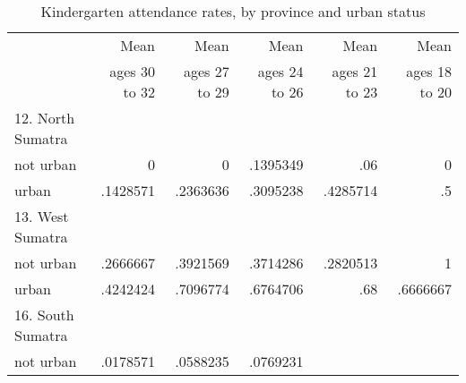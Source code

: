 \begin{table}[!h]
\caption{Kindergarten attendance rates, by province and urban status}
\centering
\begin{tabular}{llllll}
\cline{1-6}
\multicolumn{1}{c}{} &
  \multicolumn{1}{|r}{Mean} &
  \multicolumn{1}{r}{Mean} &
  \multicolumn{1}{r}{Mean} &
  \multicolumn{1}{r}{Mean} &
  \multicolumn{1}{r}{Mean} \\
\multicolumn{1}{c}{} &
  \multicolumn{1}{|r}{ages 30 to 32} &
  \multicolumn{1}{r}{ages 27 to 29} &
  \multicolumn{1}{r}{ages 24 to 26} &
  \multicolumn{1}{r}{ages 21 to 23} &
  \multicolumn{1}{r}{ages 18 to 20} \\
\cline{1-6}
\multicolumn{1}{l}{12. North Sumatra} &
  \multicolumn{1}{|r}{} &
  \multicolumn{1}{r}{} &
  \multicolumn{1}{r}{} &
  \multicolumn{1}{r}{} &
  \multicolumn{1}{r}{} \\
\multicolumn{1}{l}{\hspace{1em}not urban} &
  \multicolumn{1}{|r}{0} &
  \multicolumn{1}{r}{0} &
  \multicolumn{1}{r}{.1395349} &
  \multicolumn{1}{r}{.06} &
  \multicolumn{1}{r}{0} \\
\multicolumn{1}{l}{\hspace{1em}urban} &
  \multicolumn{1}{|r}{.1428571} &
  \multicolumn{1}{r}{.2363636} &
  \multicolumn{1}{r}{.3095238} &
  \multicolumn{1}{r}{.4285714} &
  \multicolumn{1}{r}{.5} \\
\multicolumn{1}{l}{13. West Sumatra} &
  \multicolumn{1}{|r}{} &
  \multicolumn{1}{r}{} &
  \multicolumn{1}{r}{} &
  \multicolumn{1}{r}{} &
  \multicolumn{1}{r}{} \\
\multicolumn{1}{l}{\hspace{1em}not urban} &
  \multicolumn{1}{|r}{.2666667} &
  \multicolumn{1}{r}{.3921569} &
  \multicolumn{1}{r}{.3714286} &
  \multicolumn{1}{r}{.2820513} &
  \multicolumn{1}{r}{1} \\
\multicolumn{1}{l}{\hspace{1em}urban} &
  \multicolumn{1}{|r}{.4242424} &
  \multicolumn{1}{r}{.7096774} &
  \multicolumn{1}{r}{.6764706} &
  \multicolumn{1}{r}{.68} &
  \multicolumn{1}{r}{.6666667} \\
\multicolumn{1}{l}{16. South Sumatra} &
  \multicolumn{1}{|r}{} &
  \multicolumn{1}{r}{} &
  \multicolumn{1}{r}{} &
  \multicolumn{1}{r}{} &
  \multicolumn{1}{r}{} \\
\multicolumn{1}{l}{\hspace{1em}not urban} &
  \multicolumn{1}{|r}{.0178571} &
  \multicolumn{1}{r}{.0588235} &
  \multicolumn{1}{r}{.0769231} &

\end{tabular}
\end{table}

